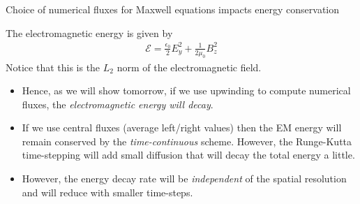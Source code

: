 \documentclass[pdf]{beamer}
\theoremstyle{definition}
\begin{document}

\begin{frame}{Choice of numerical fluxes for Maxwell equations impacts
    energy conservation}

  The electromagnetic energy is given by
  \begin{align*}
    \mathcal{E} = \frac{\epsilon_0}{2} E_y^2 + \frac{1}{2\mu_0} B_z^2
  \end{align*}
  Notice that this is the $L_2$ norm of the electromagnetic
  field. 
  \begin{itemize}
  \item Hence, as we will show tomorrow, if we use upwinding to
    compute numerical fluxes, the \emph{electromagnetic energy will
      decay}.
  \item If we use central fluxes (average left/right values) then the
    EM energy will remain conserved by the \emph{time-continuous}
    scheme. However, the Runge-Kutta time-stepping will add small
    diffusion that will decay the total energy a little.
  \item However, the energy decay rate will be \emph{independent} of
    the spatial resolution and will reduce with smaller time-steps.
  \end{itemize}
\end{frame}

\end{document}
